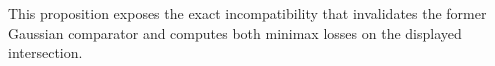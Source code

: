 This proposition exposes the exact incompatibility that invalidates the former Gaussian comparator and computes both minimax losses on the displayed intersection.